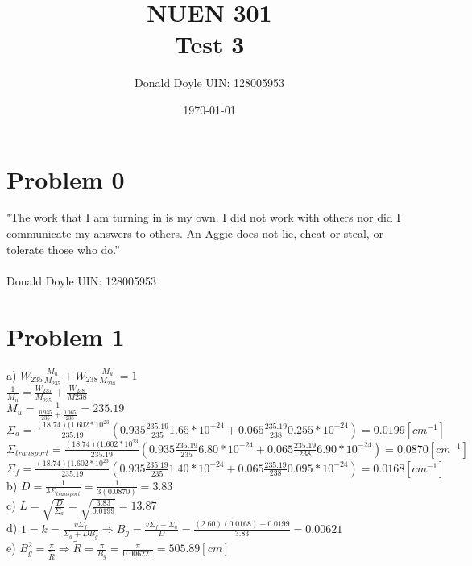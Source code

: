 \documentclass[12pt,fleqn, parskip=full]{scrartcl}
\title{NUEN 301 \\
Test 3}
\author{Donald Doyle UIN: 128005953}
\date{\today}
\begin{document}
\maketitle

\section{Problem 0}
 "The work that I am turning in is my own. I did not work with others nor did I communicate my answers to others. An Aggie does not lie, cheat or steal, or tolerate those who do.” \\ \\
Donald Doyle  UIN: 128005953

\section{Problem 1}
a) $W_235 \frac{M_u}{M_235} + W_238 \frac{M_u}{M_238} = 1$\\ 

$\frac{1}{M_u} = \frac{W_235}{M_235} + \frac{W_238}{M238}$\\

$M_u = \frac{1}{\frac{0.935}{235} + \frac{0.065}{238}} = 235.19$\\

$\Sigma_a = \frac{(18.74)(1.602*10^{23}}{235.19}(0.935\frac{235.19}{235}1.65*10^{-24}+0.065\frac{235.19}{238}0.255*10^{-24}) = 0.0199 [cm^{-1}]$ \\

$\Sigma_{transport} = \frac{(18.74)(1.602*10^{23}}{235.19}(0.935\frac{235.19}{235}6.80*10^{-24}+0.065\frac{235.19}{238}6.90*10^{-24}) = 0.0870 [cm^{-1}]$ \\

$\Sigma_f = \frac{(18.74)(1.602*10^{23}}{235.19}(0.935\frac{235.19}{235}1.40*10^{-24}+0.065\frac{235.19}{238}0.095*10^{-24}) = 0.0168 [cm^{-1}]$ \\

b) $ D = \frac{1}{3 \Sigma_{transport}} = \frac{1}{3(0.0870)} = 3.83$\\

c) $L = \sqrt{\frac{D}{\Sigma_a}} = \sqrt{\frac{3.83}{0.0199}} = 13.87$\\

d) $ 1 = k = \frac{v\Sigma_f}{\Sigma_a + DB_g} \Rightarrow B_g = \frac{v\Sigma_f - \Sigma_a}{D} = \frac{(2.60)(0.0168) - 0.0199}{3.83} = 0.00621$\\

e) $ B_g^2 = \frac{\pi}{\tilde{R}} \Rightarrow \tilde{R} = \frac{\pi}{B_g} = \frac{\pi}{0.006221} = 505.89 [cm]$\\
\end{document}
